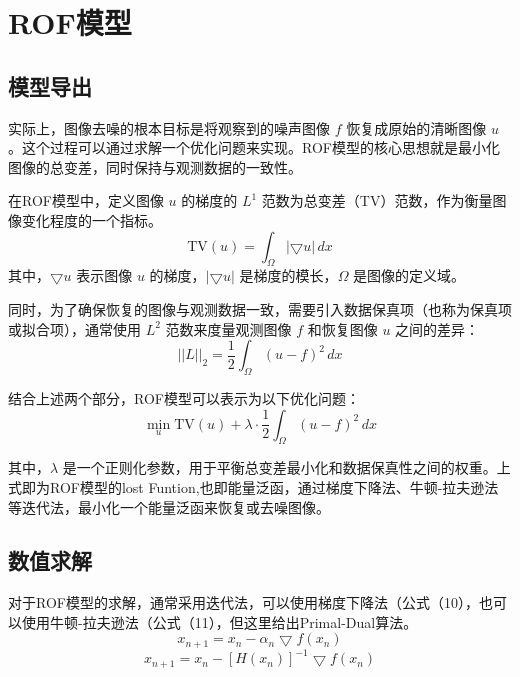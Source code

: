 \titleformat{\chapter}[hang]{\linespread{1}\heiti\sanhao\bfseries\filright}{\thechapter}{1em}{}{}
\chapter{ROF模型}
\section{模型导出}
实际上，图像去噪的根本目标是将观察到的噪声图像 $ f $ 恢复成原始的清晰图像 $ u $。这个过程可以通过求解一个优化问题来实现。ROF模型的核心思想就是最小化图像的总变差，同时保持与观测数据的一致性。

在ROF模型中，定义图像 $ u $ 的梯度的 $ L^1 $ 范数为总变差（TV）范数，作为衡量图像变化程度的一个指标。\cite{rudin1994total}
\begin{equation}
    \text{TV}(u) = \int_{\Omega} |\bigtriangledown u| \, dx 
    \tag{7}
\end{equation}
其中，$ \bigtriangledown u $ 表示图像 $ u $ 的梯度，$ |\bigtriangledown u| $ 是梯度的模长，$ \Omega $ 是图像的定义域。

同时，为了确保恢复的图像与观测数据一致，需要引入数据保真项（也称为保真项或拟合项），通常使用 $ L^2 $ 范数来度量观测图像 $ f $ 和恢复图像 $ u $ 之间的差异：
\begin{equation}
||L||_2=\frac{1}{2} \int_{\Omega} (u - f)^2 \, dx 
\tag{8}
\end{equation}

结合上述两个部分，ROF模型可以表示为以下优化问题：
\begin{equation}
     \min_{u} \text{TV}(u) + \lambda \cdot \frac{1}{2} \int_{\Omega} (u - f)^2 \, dx 
     \tag{9}
\end{equation}

其中，$ \lambda $ 是一个正则化参数，用于平衡总变差最小化和数据保真性之间的权重。上式即为ROF模型的lost Funtion,也即能量泛函，通过梯度下降法、牛顿-拉夫逊法等迭代法，最小化一个能量泛函来恢复或去噪图像。

\section{数值求解}
对于ROF模型的求解，通常采用迭代法，可以使用梯度下降法（公式（10），也可以使用牛顿-拉夫逊法（公式（11），但这里给出Primal-Dual算法\cite{chen2013primal}。
\begin{equation}
     x_{n+1} = x_n - \alpha_n \bigtriangledown f(x_n) \tag{10} 
\end{equation}
\begin{equation}
        x_{n+1} = x_n - [H(x_n)]^{-1} \bigtriangledown f(x_n) \tag{11}
\end{equation}

